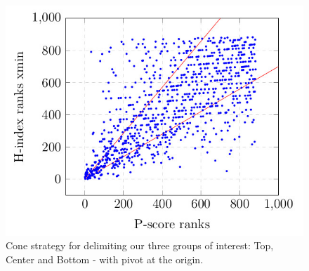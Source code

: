 \documentclass[man,floatsintext]{apa6}
\begin{document}
\begin{figure}[h!]
  \begin{center}
    \centerline{\includegraphics[scale=0.4]{cone_strategy}}

    \caption{Cone strategy for delimiting our three groups of interest: Top, Center and Bottom - with pivot at the origin.}
    \label{fig:cone_strategy}
  \end{center}
\end{figure}
\end{document}
